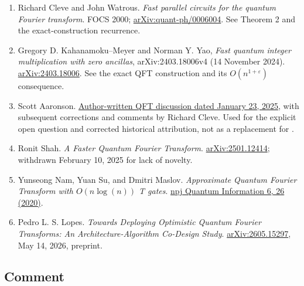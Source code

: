 \begin{enumerate}[label={},leftmargin=4.8em,labelsep=0.5em]
  \footnotesize
  \item[\textup{[Cleve00]}]\label{ref:3b3b-cleve00}
  Richard Cleve and John Watrous. \emph{Fast parallel circuits for the quantum Fourier transform}. FOCS 2000; \href{https://arxiv.org/abs/quant-ph/0006004}{arXiv:quant-ph/0006004}. See Theorem 2 and the exact-construction recurrence.

  \item[\textup{[KMY24]}]\label{ref:3b3b-kmy24}
  Gregory D. Kahanamoku--Meyer and Norman Y. Yao, \emph{Fast quantum integer multiplication with zero ancillas}, arXiv:2403.18006v4 (14 November 2024). \href{https://arxiv.org/abs/2403.18006}{arXiv:2403.18006}. See the exact QFT construction and its $O(n^{1+\varepsilon})$ consequence.

  \item[\textup{[Aaronson25]}]\label{ref:3b3b-aaronson25}
  Scott Aaronson. \href{https://scottaaronson.blog/?p=8593}{Author-written QFT discussion dated January 23, 2025}, with subsequent corrections and comments by Richard Cleve. Used for the explicit open question and corrected historical attribution, not as a replacement for .

  \item[\textup{[Shah25]}]\label{ref:3b3b-shah25}
  Ronit Shah. \emph{A Faster Quantum Fourier Transform}. \href{https://arxiv.org/abs/2501.12414}{arXiv:2501.12414}; withdrawn February 10, 2025 for lack of novelty.

  \item[\textup{[Nam20]}]\label{ref:3b3b-nam20}
  Yunseong Nam, Yuan Su, and Dmitri Maslov. \emph{Approximate Quantum Fourier Transform with $O(n\log(n))$ T gates}. \href{https://www.nature.com/articles/s41534-020-0257-5}{npj Quantum Information 6, 26 (2020)}.

  \item[\textup{[Lopes26]}]\label{ref:3b3b-lopes26}
  Pedro L. S. Lopes. \emph{Towards Deploying Optimistic Quantum Fourier Transforms: An Architecture-Algorithm Co-Design Study}. \href{https://arxiv.org/abs/2605.15297}{arXiv:2605.15297}, May 14, 2026, preprint.
\end{enumerate}

\subsection*{Comment}

